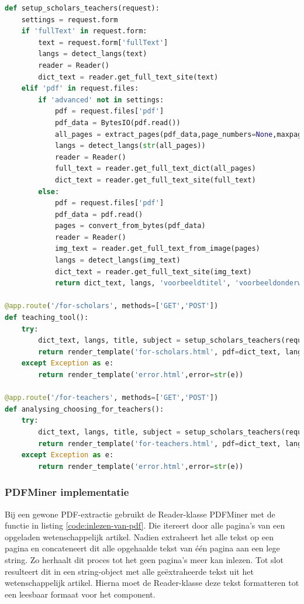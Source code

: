 \begin{lstlisting}[language=Python, caption={Koppeling tussen front-end en back-end voor het inlezen van een wetenschappelijk artikel}, label={code:inlezen-wetenschappelijk-artikel-front-end-back-end}]
def setup_scholars_teachers(request):
	settings = request.form
	if 'fullText' in request.form:
		text = request.form['fullText']
		langs = detect_langs(text)
		reader = Reader()
		dict_text = reader.get_full_text_site(text)                
	elif 'pdf' in request.files:
		if 'advanced' not in settings:
			pdf = request.files['pdf']
			pdf_data = BytesIO(pdf.read())
			all_pages = extract_pages(pdf_data,page_numbers=None,maxpages=999)
			langs = detect_langs(str(all_pages))
			reader = Reader()
			full_text = reader.get_full_text_dict(all_pages)
			dict_text = reader.get_full_text_site(full_text)
		else:
			pdf = request.files['pdf']
			pdf_data = pdf.read()
			pages = convert_from_bytes(pdf_data)
			reader = Reader()
			img_text = reader.get_full_text_from_image(pages)
			langs = detect_langs(img_text)
			dict_text = reader.get_full_text_site(img_text)                            
			return dict_text, langs, 'voorbeeldtitel', 'voorbeeldonderwerp'
			
@app.route('/for-scholars', methods=['GET','POST'])
def teaching_tool():
	try:
		dict_text, langs, title, subject = setup_scholars_teachers(request)
		return render_template('for-scholars.html', pdf=dict_text, lang=langs, title=title, subject=subject)
	except Exception as e:
		return render_template('error.html',error=str(e))
	
@app.route('/for-teachers', methods=['GET','POST'])
def analysing_choosing_for_teachers():
	try:
		dict_text, langs, title, subject = setup_scholars_teachers(request)
		return render_template('for-teachers.html', pdf=dict_text, lang=langs, title=title, subject=subject)
	except Exception as e:
		return render_template('error.html',error=str(e))
\end{lstlisting}

\subsubsection{PDFMiner implementatie}

Bij een gewone PDF-extractie gebruikt de Reader-klasse PDFMiner met de functie in listing \ref{code:inlezen-van-pdf}. Die itereert door alle pagina's van een opgeladen wetenschappelijk artikel. Nadien extraheert het alle tekst op een pagina en concateneert dit alle opgehaalde tekst van één pagina aan een lege string. Zo herhaalt dit proces tot het geen pagina's meer kan inlezen. Tot slot resulteert dit in een string-object met alle geëxtraheerde tekst uit het wetenschappelijk artikel. Hierna moet de Reader-klasse deze tekst formatteren tot een leesbaar formaat voor het component.


